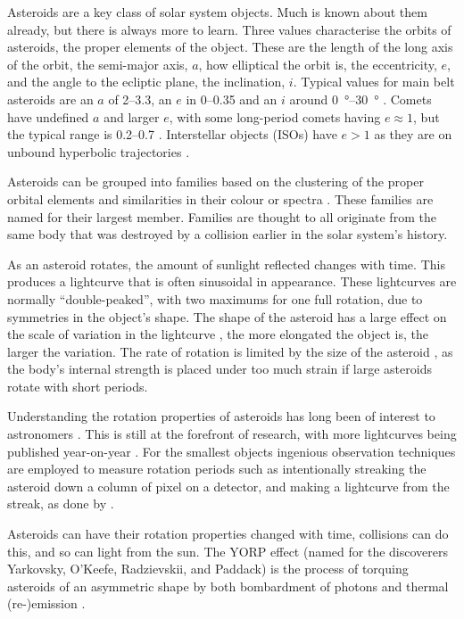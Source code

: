 \documentclass{UCreport}
\begin{document}
Asteroids are a key class of solar system objects. Much is known about them already, but there is always more to learn.
Three values characterise the orbits of asteroids, the proper elements of the object.
These are the length of the long axis of the orbit, the semi-major axis, $a$, how elliptical the orbit is, the eccentricity, $e$, and the angle to the ecliptic plane, the inclination, $i$.
Typical values for main belt asteroids are an $a$ of \qtyrange{2}{3.3}{\au}, an $e$ in \qtyrange{0}{0.35}{} and an $i$ around \qtyrange{0}{30}{\degree} \citep{DeMeo2015}.
Comets have undefined $a$ and larger $e$, with some long-period comets having $e\approx 1$, but the typical range is \qtyrange{0.2}{0.7}{} \citep{Lewis2012}.
Interstellar objects (ISOs) have $e>1$ as they are on unbound hyperbolic trajectories \citep{McGlynn1989}.

Asteroids can be grouped into families based on  the  clustering of the proper orbital elements and similarities in their colour or spectra \citep{Nesvorny2015}.
These families are named for their largest member.
Families are thought to all originate from the same body that was destroyed by a collision earlier in the solar system's history.

As an asteroid rotates, the amount of sunlight reflected changes with time.
This produces a lightcurve that is often sinusoidal in appearance.
These lightcurves are normally ``double-peaked'', with two maximums for one full rotation, due to symmetries in the object's shape. 
The shape of the asteroid has a large effect on the scale of variation in the lightcurve \citep{Durech2015}, the more elongated the object is, the larger the variation.
The rate of rotation is limited by the size of the asteroid \citep{Pravec2000}, as the body's internal strength is placed under too much strain if large
asteroids rotate with short periods.

Understanding the rotation properties of asteroids has long been of interest to astronomers \citep[e.g.][for early work into the limits of rotation period and the tumbling nature of some small bodies]{Weidenschilling1981,Harris1994}.
This is still at the forefront of research, with more lightcurves being published year-on-year \citep{Harris2015}.
For the smallest objects ingenious observation techniques are employed to measure rotation periods such as intentionally streaking the asteroid down a column of pixel on a detector, and making a lightcurve from the streak, as done by \citet{Bolin2023}.

Asteroids can have their rotation properties changed with time, collisions can do this, and so can light from the sun.
The YORP effect (named for the discoverers Yarkovsky, O'Keefe, Radzievskii, and Paddack) is the process of torquing asteroids of an asymmetric shape by both bombardment of photons and thermal (re-)emission \citep{Rubincam2000}.
\end{document}
